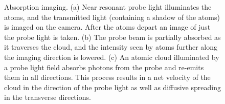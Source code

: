 \documentclass[12pt]{iopart}
\begin{document}
\begin{figure}
\caption{Absorption imaging. (a) Near resonant probe light illuminates the atoms, and the transmitted light (containing a shadow of the atoms) is imaged on the camera. After the atoms depart an image of just the probe light is taken. (b)  The probe beam is partially absorbed as it traverses the cloud, and the intensity seen by atoms further along the imaging direction \ez{} is lowered.  (c) An atomic cloud illuminated by a probe light field absorbs photons from the probe and re-emits them in all directions. This process results in a net velocity of the cloud in the direction of the probe light as well as diffusive spreading in the transverse directions.  }
\label{fig:absorptionIntor}
\end{figure}
\end{document}
